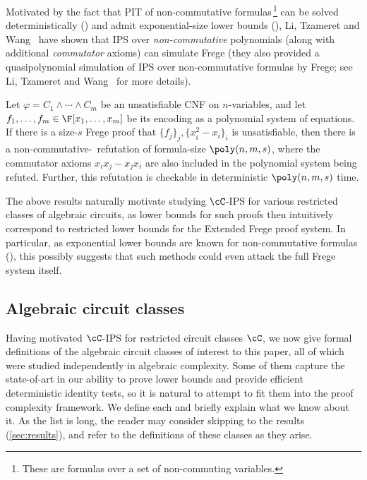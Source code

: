 \documentclass[11pt]{article}
\numberwithin{equation}{section}
\theoremstyle{definition}
\theoremstyle{plain}
\begin{document}
Motivated by the fact that PIT of non-commutative formulas\,\footnote{These are formulas over a set of non-commuting variables.} can be solved deterministically (\cite{RazShpilka05}) and admit
exponential-size lower bounds (\cite{Nisan91}), Li, Tzameret and Wang~\cite{LiTW15} have shown that IPS over \emph{non-commutative} polynomials (along with additional \emph{commutator} axioms) can simulate Frege (they also provided a quasipolynomial simulation of IPS over non-commutative formulas by Frege; see Li, Tzameret and Wang~\cite{LiTW15} for more details).

\begin{theoremwp}\label{thm:LTW}
        Let $\varphi=C_1\wedge\cdots\wedge C_m$ be an unsatisfiable CNF on $n$-variables, and let $f_1,\ldots,f_m\in\F[x_1,\ldots,x_m]$ be its encoding as a polynomial system of equations. If there is a size-$s$ Frege proof that $\{f_j\}_j,\{x_i^2-x_i\}_i$ is unsatisfiable, then there is a non-commutative-\IPS\ refutation of formula-size $\poly(n,m,s)$, where the commutator axioms $x_ix_j-x_jx_i$ are also included in the polynomial system being refuted. Further, this refutation is checkable in deterministic $\poly(n,m,s)$ time.
\end{theoremwp}

The above results naturally motivate studying $\cC$-IPS for various restricted classes of algebraic circuits, as lower bounds for such proofs then intuitively correspond to restricted lower bounds for the Extended Frege proof system.  In particular, as exponential lower bounds are known for non-commutative formulas (\cite{Nisan91}), this possibly suggests that such methods could even attack the full Frege system itself.

\subsection{Algebraic circuit classes}\label{sec:intro:circuits}

Having motivated $\cC$-IPS for restricted circuit classes $\cC$, we now give formal definitions of the algebraic circuit classes of interest to this paper, all of which were studied independently in algebraic complexity. Some of them capture the state-of-art in our ability to prove lower bounds and provide efficient deterministic identity tests, so it is natural to attempt to fit them into the proof complexity framework. We define each and briefly explain what we know about it. As the list is long, the reader may consider skipping to the results (\autoref{sec:results}), and refer to the definitions of these classes as they arise.
\end{document}
